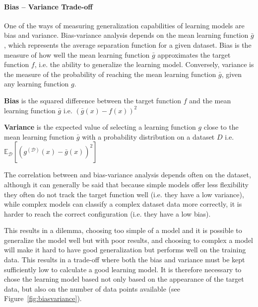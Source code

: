 \paragraph{Bias -- Variance Trade-off}
\label{par:Bias-VarianceTrade-off}
One of the ways of measuring generalization capabilities of learning models are bias and variance. Bias-variance analysis depends on the mean learning function $\bar{g}$,
which represents the average separation function for a given dataset.
Bias is the measure of how well the mean learning function $\bar{g}$ approximates the target function $f$, i.e. the ability to generalize the learning model. Conversely,
variance is the measure of the probability of reaching the mean learning function $\bar{g}$, given any learning function $g$.
\begin{dfnt}
  \textbf{Bias} is the squared difference between the target function $f$ and the mean learning function $\bar{g}$ i.e. $\left(\bar{g}(x)-f(x)\right)^2$
\end{dfnt}
\begin{dfnt}
  \textbf{Variance} is the expected value of selecting a learning function $g$ close to the mean learning function $\bar{g}$ with a probability distribution on
  a dataset $D$ i.e. $\mathbb{E}_\mathcal{D}\left[(g^{(\mathcal{D})}(x)-\bar{g}(x))^2\right]$
\end{dfnt}

The correlation between and bias-variance analysis depends often on the dataset,
although it can generally be said that because simple models offer less flexibility they often do not track the target function well (i.e. they have a low variance),
while complex models can classify a complex dataset data more correctly, it is harder to reach the correct configuration (i.e. they have a low bias).

This results in a dilemma, choosing too simple of a model and it is possible to generalize the model well but with poor results, and choosing to
complex a model will make it hard to have good generalization but performs well on the training data.
This results in a trade-off where both the bias and variance must be kept sufficiently low to calculate a good learning model.
It is therefore necessary to chose the learning model based not only based on the appearance of the target data, but also on the number of data points available (see Figure~\ref{fig:biasvariance}).

\begin{minipage}{\linewidth}
\centering
{}
\label{fig:biasvariance}
\end{minipage}

